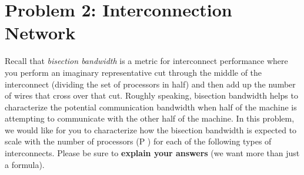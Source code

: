 \documentclass[11pt]{article}
\begin{document}
\section*{Problem 2: Interconnection Network}
Recall that \textit{bisection bandwidth} is a metric for interconnect performance where you perform an imaginary representative cut through the middle of the interconnect (dividing the set of processors in half) and then add up the number of wires that cross over that cut. Roughly speaking, bisection bandwidth helps to characterize the potential communication bandwidth when half of the machine is attempting to communicate with the other half of the machine.
In this problem, we would like for you to characterize how the bisection bandwidth is expected to scale with the number of processors (P ) for each of the following types of interconnects. Please be sure to \textbf{ explain your answers} (we want more than just a formula).
\end{document}
